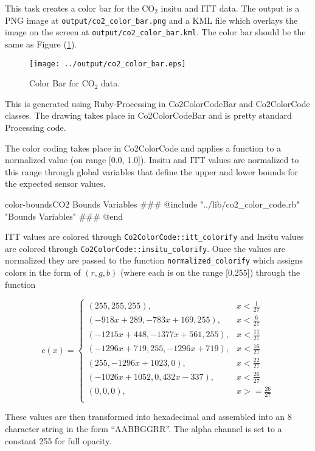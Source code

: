 \documentclass[12pt]{article}
\begin{document}
This task creates a color bar for the CO$_2$ insitu and ITT data.  The output is a PNG image at \texttt{output/co2\_color\_bar.png} and a KML file which overlays the image on the screen at \texttt{output/co2\_color\_bar.kml}.  The color bar should be the same as Figure (\ref{co2-color-bar}).   

\begin{figure}
\centering
\texttt{[image: ../output/co2\_color\_bar.eps]}
\caption{Color Bar for CO$_2$ data.}
\label{co2-color-bar}
\end{figure}

This is generated using Ruby-Processing in Co2ColorCodeBar and Co2ColorCode classes.  The drawing takes place in Co2ColorCodeBar and is pretty standard Processing code.  

The color coding takes place in Co2ColorCode and applies a function to a normalized value (on range [0.0, 1.0]).  Insitu and ITT values are normalized to this range through global variables that define the upper and lower bounds for the expected sensor values.

\begin{code}{color-bounds}{CO2 Bounds Variables}
### @include "../lib/co2_color_code.rb" "Bounds Variables"
### @end
\end{code}

ITT values are colored through \texttt{Co2ColorCode::itt\_colorify} and Insitu values are colored through \texttt{Co2ColorCode::insitu\_colorify}.  Once the values are normalized they are passed to the function \texttt{normalized\_colorify} which assigns colors in the form of $(r,g,b)$ (where each is on the range [0,255]) through the function

\begin{equation}
\label{normalized-colorify}
c(x)= \begin{cases}
(255,255,255), & x < \frac{1}{27} \\
(-918x+289,-783x+169,255), & x < \frac{6}{27} \\
(-1215x+448,-1377x+561,255), & x < \frac{11}{27} \\
(-1296x+719,255,-1296x+719), & x < \frac{16}{27} \\
(255,-1296x+1023,0), & x < \frac{22}{27} \\
(-1026x+1052,0,432x-337), & x < \frac{26}{27} \\
(0,0,0), & x >= \frac{26}{27} \\
\end{cases}
\end{equation}

These values are then transformed into hexadecimal and assembled into an 8 character string in the form ``AABBGGRR''.  The alpha channel is set to a constant 255 for full opacity.
\end{document}

